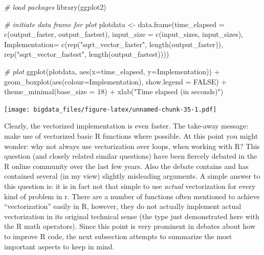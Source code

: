 \documentclass[
  12pt,
]{style/krantz}
\newenvironment{Shaded}{\begin{snugshade}}{\end{snugshade}}
\newcommand{\AttributeTok}[1]{\textcolor[rgb]{0.77,0.63,0.00}{#1}}
\newcommand{\CommentTok}[1]{\textcolor[rgb]{0.56,0.35,0.01}{\textit{#1}}}
\newcommand{\ConstantTok}[1]{\textcolor[rgb]{0.00,0.00,0.00}{#1}}
\newcommand{\DecValTok}[1]{\textcolor[rgb]{0.00,0.00,0.81}{#1}}
\newcommand{\FunctionTok}[1]{\textcolor[rgb]{0.00,0.00,0.00}{#1}}
\newcommand{\NormalTok}[1]{#1}
\newcommand{\OtherTok}[1]{\textcolor[rgb]{0.56,0.35,0.01}{#1}}
\newcommand{\SpecialCharTok}[1]{\textcolor[rgb]{0.00,0.00,0.00}{#1}}
\newcommand{\StringTok}[1]{\textcolor[rgb]{0.31,0.60,0.02}{#1}}
\begin{document}
\begin{Shaded}
\begin{Highlighting}[]
\CommentTok{\# load packages}
\FunctionTok{library}\NormalTok{(ggplot2)}

\CommentTok{\# initiate data frame for plot}
\NormalTok{plotdata }\OtherTok{\textless{}{-}} \FunctionTok{data.frame}\NormalTok{(}\AttributeTok{time\_elapsed =} \FunctionTok{c}\NormalTok{(output\_faster, output\_fastest),}
                       \AttributeTok{input\_size =} \FunctionTok{c}\NormalTok{(input\_sizes, input\_sizes),}
                       \AttributeTok{Implementation=} \FunctionTok{c}\NormalTok{(}\FunctionTok{rep}\NormalTok{(}\StringTok{"sqrt\_vector\_faster"}\NormalTok{, }\FunctionTok{length}\NormalTok{(output\_faster)),}
                            \FunctionTok{rep}\NormalTok{(}\StringTok{"sqrt\_vector\_fastest"}\NormalTok{, }\FunctionTok{length}\NormalTok{(output\_fastest))))}

\CommentTok{\# plot}
\FunctionTok{ggplot}\NormalTok{(plotdata, }\FunctionTok{aes}\NormalTok{(}\AttributeTok{x=}\NormalTok{time\_elapsed, }\AttributeTok{y=}\NormalTok{Implementation)) }\SpecialCharTok{+}
     \FunctionTok{geom\_boxplot}\NormalTok{(}\FunctionTok{aes}\NormalTok{(}\AttributeTok{colour=}\NormalTok{Implementation),}
                          \AttributeTok{show.legend =} \ConstantTok{FALSE}\NormalTok{) }\SpecialCharTok{+}
     \FunctionTok{theme\_minimal}\NormalTok{(}\AttributeTok{base\_size =} \DecValTok{18}\NormalTok{) }\SpecialCharTok{+}
     \FunctionTok{xlab}\NormalTok{(}\StringTok{"Time elapsed (in seconds)"}\NormalTok{)}
\end{Highlighting}
\end{Shaded}

\texttt{[image: bigdata\_files/figure-latex/unnamed-chunk-35-1.pdf]}

Clearly, the vectorized implementation is even faster. The take-away message: make use of vectorized basic R functions where possible. At this point you might wonder: why not always use vectorization over loops, when working with R? This question (and closely related similar questions) have been fiercely debated in the R online community over the last few years. Also the debate contains and has contained several (in my view) slightly misleading arguments. A simple answer to this question is: it is in fact not that simple to use \emph{actual} vectorization for every kind of problem in r. There are a number of functions often mentioned to achieve ``vectorization'' easily in R, however, they do not actually implement actual vectorization in its original technical sense (the type just demonstrated here with the R math operators). Since this point is very prominent in debates about how to improve R code, the next subsection attempts to summarize the most important aspects to keep in mind.
\end{document}
